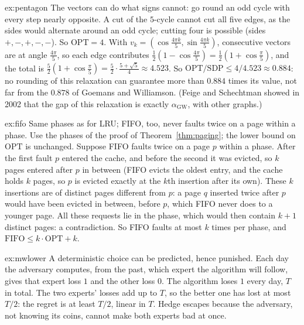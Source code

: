 \begin{solution}{ex:pentagon}
\idea The vectors can do what signs cannot: go round an odd cycle with every step nearly opposite.
\writeup A cut of the $5$-cycle cannot cut all five edges, as the sides would alternate around an odd cycle; cutting four is possible (sides $+,-,+,-,-$). So $\mathrm{OPT}=4$. With $v_k=(\cos\frac{4\pi k}5,\sin\frac{4\pi k}5)$, consecutive vectors are at angle $\frac{4\pi}5$, so each edge contributes $\frac12(1-\cos\frac{4\pi}5)=\frac12(1+\cos\frac\pi5)$, and the total is $\frac52(1+\cos\frac\pi5)=\frac52\cdot\frac{5+\sqrt5}4\approx4.523$.
So $\mathrm{OPT}/\mathrm{SDP}\le4/4.523\approx0.884$: no rounding of this relaxation can guarantee more than $0.884$ times its value, not far from the $0.878$ of Goemans and Williamson. (Feige and Schechtman showed in 2002 that the gap of this relaxation is exactly $\alpha_{\mathrm{GW}}$, with other graphs.)
\end{solution}

\begin{solution}{ex:fifo}
\idea Same phases as for LRU; FIFO, too, never faults twice on a page within a phase.
\writeup Use the phases of the proof of Theorem~\ref{thm:paging}; the lower bound on $\mathrm{OPT}$ is unchanged. Suppose FIFO faults twice on a page $p$ within a phase. After the first fault $p$ entered the cache, and before the second it was evicted, so $k$ pages entered after $p$ in between (FIFO evicts the oldest entry, and the cache holds $k$ pages, so $p$ is evicted exactly at the $k$th insertion after its own). These $k$ insertions are of distinct pages different from $p$: a page $q$ inserted twice after $p$ would have been evicted in between, before $p$, which FIFO never does to a younger page.
All these requests lie in the phase, which would then contain $k+1$ distinct pages: a contradiction. So FIFO faults at most $k$ times per phase, and $\mathrm{FIFO}\le k\cdot\mathrm{OPT}+k$.
\end{solution}

\begin{solution}{ex:mwlower}
\idea A deterministic choice can be predicted, hence punished.
\writeup Each day the adversary computes, from the past, which expert the algorithm will follow, gives that expert loss $1$ and the other loss $0$. The algorithm loses $1$ every day, $T$ in total. The two experts' losses add up to $T$, so the better one has lost at most $T/2$: the regret is at least $T/2$, linear in $T$. Hedge escapes because the adversary, not knowing its coins, cannot make both experts bad at once.
\end{solution}

